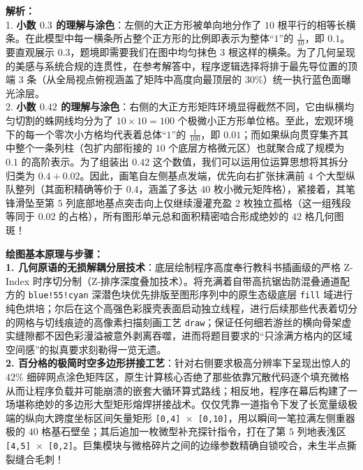 {\small\color{gray}
\textbf{解析：}\\
1. \textbf{小数 $0.3$ 的理解与涂色}：左侧的大正方形被单向地分作了 $10$ 根平行的相等长横条。在此模型中每一横条所占整个正方形的比例即表示为整体“$1$”的 $\frac{1}{10}$，即 $0.1$。要直观展示 $0.3$，题境即需要我们在图中均匀抹色 $3$ 根这样的横条。为了几何呈现的美感与系统合规的连贯性，在参考解答中，程序逻辑选择将排于最先导位置的顶端 $3$ 条（从全局视点俯视涵盖了矩阵中高度向最顶层的 $30\%$）统一执行蓝色面曝光涂层。\\
2. \textbf{小数 $0.42$ 的理解与涂色}：右侧的大正方形矩阵环境显得截然不同，它由纵横均匀切割的蛛网线均分为了 $10 \times 10 = 100$ 个极微小正方形单位格。至此，宏观环境下的每一个零次小方格均代表着总体“$1$”的 $\frac{1}{100}$，即 $0.01$；而如果纵向贯穿集齐其中整个一条列柱（包扩内部衔接的 $10$ 个底层方格微元区）也就聚合成了规模为 $0.1$ 的高阶表示。为了组装出 $0.42$ 这个数值，我们可以运用位运算思想将其拆分归类为 $0.4 + 0.02$。因此，画笔自左侧基点发端，优先向右扩张抹满前 $4$ 个大型纵队整列（其面积精确等价于 $0.4$，涵盖了多达 $40$ 枚小微元矩阵格），紧接着，其笔锋滑坠至第 $5$ 列底部地基点突击向上仅继续漫灌充盈 $2$ 枚独立孤格（这一组残段等同于 $0.02$ 的占格），所有图形单元总和面积精密啮合形成绝妙的 $42$ 格几何图斑！
}

\vspace{0.6cm}

{\small\color{blue!70!black}
\textbf{绘图基本原理与步骤：}\\
\textbf{1. 几何原语的无损解耦分层技术}：底层绘制程序高度奉行教科书插画级的严格 Z-Index 时序切分制（Z-排序深度叠加技术）。将充满着自带高抗锯齿防混叠通道配方的 \texttt{blue!55!cyan} 深潜色块优先排版至图形序列中的原生态级底层 \texttt{fill} 域进行纯色烘培；尔后在这个高强色彩膜壳表面启动独立线程，进行后续那些代表着切分的网格与切线痕迹的高像素扫描刻画工艺 \texttt{draw}；保证任何细若游丝的横向骨架虚实缝隙都不因色彩漫溢被意外剥离吞噬，进而将题目要求的“只涂满方格内的区域空间感”的拟真要求刻勒得一览无遗。\\
\textbf{2. 百分格的极简时空多边形拼接工艺}：针对右侧要求极高分辨率下呈现出惊人的 $42\%$ 细碎网点涂色矩阵区，原生计算核心否绝了那些依靠冗散代码逐个填充微格从而让程序负载并可能崩溃的嵌套大循环算式路线；相反地，程序在幕后构建了一场堪称绝妙的多边形大型矩形熔焊拼接战术。仅仅凭靠一道指令下发了长宽量级极端的纵向大跨度坐标区间矢量矩形 \texttt{[0,4] $\times$ [0,10]}，用以瞬间一笔拉满左侧重器极的 $40$ 格基石壁垒；其后追加一枚微型补充探针指令，打在了第 $5$ 列地表浅区 \texttt{[4,5] $\times$ [0,2]}。巨集模块与微格碎片之间的边缘参数精确自锁咬合，未生半点撕裂缝合毛刺！
}



